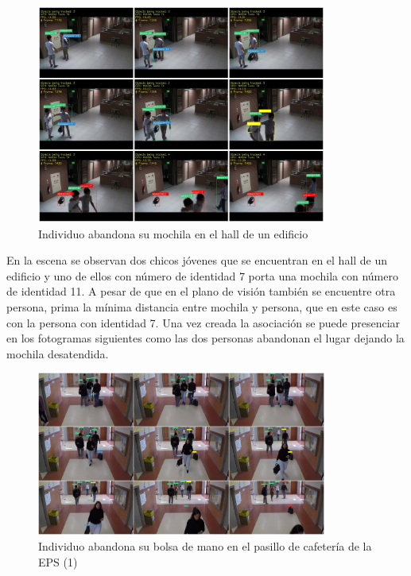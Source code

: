\begin{figure}[ht]
\centering
\includegraphics[width=0.85\textwidth]{img/chapters/resultados/abandono/abandoned-aboda-example1.png}
\caption{\label{fig:abandoned-aboda-example1}Individuo abandona su mochila en el hall de un edificio \cite{aboda-dataset}}
\end{figure}

En la escena se observan dos chicos jóvenes que se encuentran en el hall de un edificio y uno de ellos con número de identidad 7 porta una mochila con número de identidad 11. A pesar de que en el plano de visión también se encuentre otra persona, prima la mínima distancia entre mochila y persona, que en este caso es con la persona con identidad 7. Una vez creada la asociación se puede presenciar en los fotogramas siguientes como las dos personas abandonan el lugar dejando la mochila desatendida.

\begin{figure}[ht!]
\centering
\includegraphics[width=0.85\textwidth]{img/chapters/resultados/abandono/1.png}
\caption{\label{fig:results1}Individuo abandona su bolsa de mano en el pasillo de cafetería de la EPS (1) \cite{gba-dataset}}
\end{figure}

